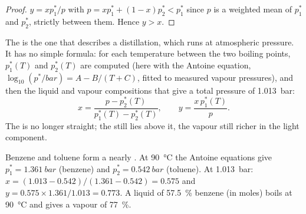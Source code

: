 \begin{proof}
$y = xp_1^*/p$ with $p = xp_1^* + (1 - x)p_2^* < p_1^*$ since $p$ is a
weighted mean of $p_1^*$ and $p_2^*$, strictly between them. Hence $y >
x$.
\end{proof}

The  is the one that describes a distillation, which runs at
atmospheric pressure. It has no simple formula: for each temperature between
the two boiling points, $p_1^*(T)$ and $p_2^*(T)$ are computed (here with the
Antoine equation, $\log_{10}(p^*/\unit{bar}) = A - B/(T + C)$, fitted to
measured vapour pressures), and then the liquid and vapour compositions that
give a total pressure of \qty{1.013}{bar}:
\[
  x = \frac{p - p_2^*(T)}{p_1^*(T) - p_2^*(T)}, \qquad y = \frac{x\,p_1^*(T)}{p} .
\]
The  is no longer straight; the  still lies above it,
the vapour still richer in the light component.

\begin{example}\label{ex:b2:liquid-vapour-diagrams:benzene-toluene}
Benzene and toluene form a nearly . At \qty{90}{\degreeCelsius}
the Antoine equations give $p_1^* = \qty{1.361}{bar}$ (benzene) and $p_2^* =
\qty{0.542}{bar}$ (toluene). At \qty{1.013}{bar}: $x = (1.013 - 0.542)/(1.361 -
0.542) = 0.575$ and $y = 0.575 \times 1.361/1.013 = 0.773$. A liquid of 57.5~\%
benzene (in moles) boils at \qty{90}{\degreeCelsius} and gives a vapour of
77~\%.
\end{example}

